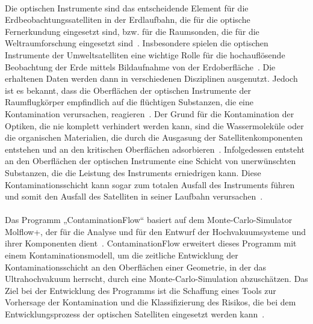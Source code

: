 \documentclass{listhesis}
\begin{document}
\paragraph{}
Die optischen Instrumente sind das entscheidende Element für die Erdbeobachtungssatelliten in der Erdlaufbahn, die für die optische Fernerkundung eingesetzt sind, bzw. für die Raumsonden, die für die Weltraumforschung eingesetzt sind~\cite{hammar}. Insbesondere spielen die optischen Instrumente der Umweltsatelliten eine wichtige Rolle für die hochauflösende Beobachtung der Erde mittels Bildaufnahme von der Erdoberfläche~\cite{zhang}. Die erhaltenen Daten werden dann in verschiedenen Disziplinen ausgenutzt. 
Jedoch ist es bekannt, dass die Oberflächen der optischen Instrumente der Raumflugkörper empfindlich auf die flüchtigen Substanzen, die eine Kontamination verursachen, reagieren~\cite{jiao}. Der Grund für die Kontamination der Optiken, die nie komplett verhindert werden kann, sind die Wassermoleküle oder die organischen Materialien, die durch die Ausgasung der Satellitenkomponenten entstehen und an den kritischen Oberflächen adsorbieren~\cite{schlappi}. Infolgedessen entsteht an den Oberflächen der optischen Instrumente eine Schicht von unerwünschten Substanzen, die die Leistung des Instruments erniedrigen kann. Diese Kontaminationsschicht kann sogar zum totalen Ausfall des Instruments führen und somit den Ausfall des Satelliten in seiner Laufbahn verursachen~\cite{jiao}.
\paragraph{}
Das Programm „ContaminationFlow“ basiert auf dem Monte-Carlo-Simulator Molflow+, der für die Analyse und für den Entwurf der Hochvakuumsysteme und ihrer Komponenten dient~\cite{molflow}. ContaminationFlow erweitert dieses Programm mit einem Kontaminationsmodell, um die zeitliche Entwicklung der Kontaminationsschicht an den Oberflächen einer Geometrie, in der das Ultrahochvakuum herrscht, durch eine Monte-Carlo-Simulation abzuschätzen. Das Ziel bei der Entwicklung des Programms ist die Schaffung eines Tools zur Vorhersage der Kontamination und die Klassifizierung des Risikos, die bei dem Entwicklungsprozess der optischen Satelliten eingesetzt werden kann~\cite{contaminaton}.
\end{document}
